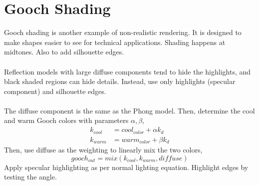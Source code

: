 \documentclass[letterpaper,12pt]{article}
\begin{document}
\section*{Gooch Shading}
Gooch shading is another example of non-realistic rendering. It is designed to make shapes easier to see for technical applications. Shading happens at midtones. Also to add silhouette edges.
\\ \\ Reflection models with large diffuse components tend to hide the highlights, and black shaded regions can hide details. Instead, use only highlights (specular component) and silhouette edges.
\\ \\ The diffuse component is the same as the Phong model. Then, determine the cool and warm Gooch colors with parameters $\alpha, \beta$,
\begin{align*}
    k_{cool} & = cool_{color} + \alpha k_d \\
    k_{warm} & = warm_{color} + \beta k_d
\end{align*}
Then, use diffuse as the weighting to linearly mix the two colors,
\begin{equation*}
    gooch_{out} = mix(k_{cool}, k_{warm}, diffuse)
\end{equation*}
Apply specular highlighting as per normal lighting equation. Highlight edges by testing the angle.
\end{document}
